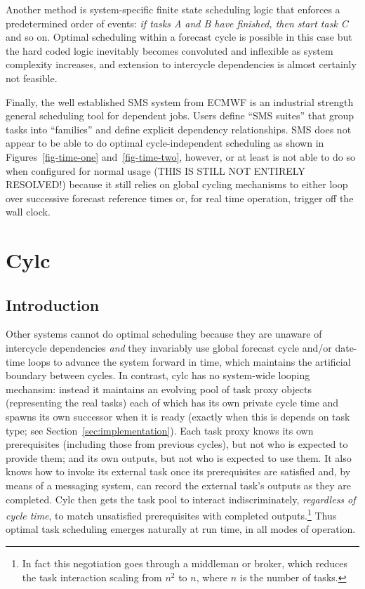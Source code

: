 \documentclass[11pt,a4paper]{article}
\begin{document}
Another method is system-specific finite state scheduling logic that
enforces a predetermined order of events: {\em if tasks A and B have
finished, then start task C} and so on. Optimal scheduling within a
forecast cycle is possible in this case but the hard coded logic
inevitably becomes convoluted and inflexible as system complexity
increases, and extension to intercycle dependencies is almost certainly
not feasible.  

Finally, the well established SMS system from ECMWF is an industrial
strength general scheduling tool for dependent jobs. Users define ``SMS
suites'' that group tasks into ``families'' and define explicit
dependency relationships. SMS does not appear to be able to do optimal
cycle-independent scheduling as shown in Figures~\ref{fig-time-one}
and~\ref{fig-time-two}, however, or at least is not able to do so when
configured for normal usage (THIS IS STILL NOT ENTIRELY RESOLVED!)
because it still relies on global cycling mechanisms to either loop
over successive forecast reference times or, for real time operation,
trigger off the wall clock.

\section{Cylc}

\subsection{Introduction}
Other systems cannot do optimal scheduling because they are unaware of
intercycle dependencies {\em and} they invariably use global forecast
cycle and/or date-time loops to advance the system forward in time,
which maintains the artificial boundary between cycles.  In contrast,
cylc has no system-wide looping mechansim: instead it maintains an
evolving pool of task proxy objects (representing the real tasks) each
of which has its own private cycle time and spawns its own successor
when it is ready (exactly when this is depends on task type; see
Section~\ref{sec:implementation}). Each task proxy knows its own
prerequisites (including those from previous cycles), but not who is
expected to provide them; and its own outputs, but not who is expected
to use them. It also knows how to invoke its external task once its
prerequisites are satisfied and, by means of a messaging system, can
record the external task's outputs as they are completed. Cylc then
gets the task pool to interact indiscriminately, {\em regardless of
cycle time}, to match unsatisfied prerequisites with completed
outputs.\footnote{In fact this negotiation goes through a middleman or
broker, which reduces the task interaction scaling from $n^2$ to $n$,
where $n$ is the number of tasks.} Thus optimal task scheduling emerges
naturally at run time, in all modes of operation.
\end{document}
